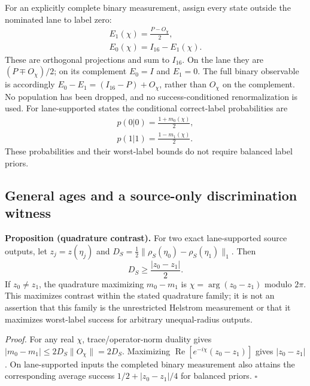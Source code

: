 For an explicitly complete binary measurement, assign every state outside
the nominated lane to label zero:
\begin{equation}
\begin{gathered}
E_1(\chi)=\frac{P-O_\chi}{2},\\
 E_0(\chi)=I_{16}-E_1(\chi).
\end{gathered}
\label{eq:chvi-decoder-complete-povm}
\end{equation}
These are orthogonal projections and sum to $I_{16}$. On the lane they
are $(P\mp O_\chi)/2$; on its complement $E_0=I$ and $E_1=0$.
The full binary observable is accordingly
$E_0-E_1=(I_{16}-P)+O_\chi$, rather than $O_\chi$ on the complement.
No population has been dropped, and no success-conditioned
renormalization is used. For lane-supported states the conditional
correct-label probabilities are
\begin{equation}
\begin{gathered}
p(0|0)=\frac{1+m_0(\chi)}{2},\\
 p(1|1)=\frac{1-m_1(\chi)}{2}.
\end{gathered}
\label{eq:chvi-decoder-correct-probabilities}
\end{equation}
These probabilities and their worst-label bounds do not require balanced
label priors.

\subsection{General ages and a source-only discrimination witness}

\noindent\textbf{Proposition (quadrature contrast).}
For two exact lane-supported source outputs, let
$z_j=z(\eta_j)$ and
$D_S=\tfrac12\|\rho_S(\eta_0)-\rho_S(\eta_1)\|_1$.
Then
\begin{equation}
 D_S\geq\frac{|z_0-z_1|}{2}.
\label{eq:chvi-decoder-source-distance}
\end{equation}
If $z_0\ne z_1$, the quadrature maximizing $m_0-m_1$ is
$\chi=\arg(z_0-z_1)$ modulo $2\pi$. This maximizes contrast within the
stated quadrature family; it is not an assertion that this family is the
unrestricted Helstrom measurement or that it maximizes worst-label
success for arbitrary unequal-radius outputs.

\emph{Proof.} For any real $\chi$, trace/operator-norm duality gives
$|m_0-m_1|\leq2D_S\|O_\chi\|=2D_S$.
Maximizing $\operatorname{Re}[e^{-i\chi}(z_0-z_1)]$ gives
$|z_0-z_1|$. On lane-supported inputs the completed binary measurement
also attains the corresponding average success
$1/2+|z_0-z_1|/4$ for balanced priors. $\square$

